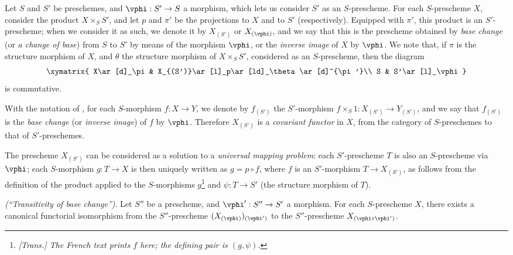 \begin{env}[3.3.6]
\label{I.3.3.6}
Let $S$ and $S'$ be preschemes, and $\vphi:S'\to S$ a morphism, which lets us consider $S'$ as an
$S$-prescheme. For each $S$-prescheme $X$, consider the product $X\times_S S'$,
and let $p$ and $\pi'$ be the projections to $X$ and to $S'$ (respectively). Equipped
with $\pi'$, this product is an $S'$-prescheme; when we consider it as such, we
denote it by $X_{(S')}$ or $X_{(\vphi)}$, and we say that this is the prescheme
obtained by \emph{base change} (or \emph{a change of base}) from $S$ to $S'$ by means of the morphism
$\vphi$, or the \emph{inverse image} of $X$ by $\vphi$. We note that, if $\pi$ is
the structure morphism of $X$, and $\theta$ the structure morphism of
$X\times_S S'$, considered as an $S$-prescheme, then the diagram
\[
  \xymatrix{
    X\ar[d]_\pi &
    X_{(S')}\ar[l]_p\ar[ld]_\theta\ar[d]^{\pi'}\\
    S &
    S'\ar[l]_\vphi
  }
\]
is commutative.
\end{env}

\begin{env}[3.3.7]
\label{I.3.3.7}
With the notation of , for each $S$-morphism $f:X\to Y$, we
denote by $f_{(S')}$ the $S'$-morphism $f\times_S 1:X_{(S')}\to Y_{(S')}$, and
we say that $f_{(S')}$ is the \emph{base change} (or \emph{inverse image}) of
$f$ by $\vphi$. Therefore $X_{(S')}$ is a \emph{covariant functor} in $X$, from
the category of $S$-preschemes to that of $S'$-preschemes.
\end{env}

\begin{env}[3.3.8]
\label{I.3.3.8}
The prescheme $X_{(S')}$ can be considered as a solution to a \emph{universal
mapping problem}: each $S'$-prescheme $T$ is also an $S$-prescheme via $\vphi$;
each $S$-morphism $g:T\to X$ is then uniquely written as $g=p\circ f$, where $f$
is an $S'$-morphism $T\to X_{(S')}$, as follows from the definition of the
product applied to the $S$-morphisms $g$\footnote{\emph{[Trans.] The French
text prints $f$ here; the defining pair is $(g,\psi)$.}} and
$\psi:T\to S'$ (the structure morphism of $T$).
\end{env}

\begin{proposition}[3.3.9]
\label{I.3.3.9}
\emph{(``Transitivity of base change'')}. Let $S''$ be a prescheme, and
$\vphi':S''\to S'$ a morphism. For each $S$-prescheme $X$, there exists a
canonical functorial isomorphism from the $S''$-prescheme
$(X_{(\vphi)})_{(\vphi')}$ to the $S''$-prescheme $X_{(\vphi\circ\vphi')}$.
\end{proposition}

